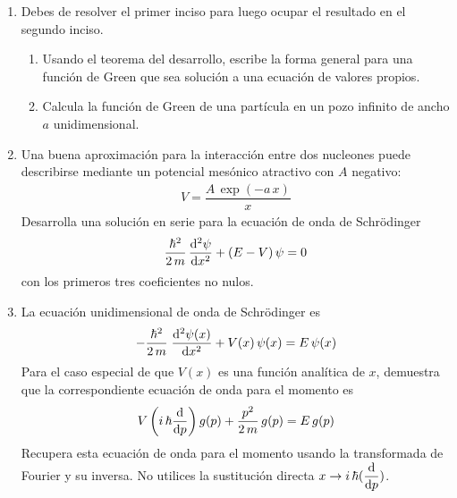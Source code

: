 \begin{enumerate}
\item Debes de resolver el primer inciso para luego ocupar el resultado en el segundo inciso.
\begin{enumerate}
\item Usando el teorema del desarrollo, escribe la forma general para una función de Green que sea solución a una ecuación de valores propios.
\item Calcula la función de Green de una partícula en un pozo infinito de ancho $a$ unidimensional.
\end{enumerate}
\item Una buena aproximación para la interacción entre dos nucleones puede describirse mediante un potencial mesónico atractivo con $A$ negativo:
\begin{align*}
V = \dfrac{A \, \exp(- a \, x)}{x}
\end{align*}
Desarrolla una solución en serie para la ecuación de onda de Schrödinger
\begin{align*}
\dfrac{\hbar^{2}}{2 \, m} \, \dv[2]{\psi}{x} + (E - V) \, \psi = 0
\end{align*}
con los primeros tres coeficientes no nulos.
\item La ecuación unidimensional de onda de Schrödinger es
\[ - \dfrac{\hbar^{2}}{2 \, m} \; \dv[2]{\psi(x)}{x} +  V(x) \, \psi(x) = E \, \psi (x) \]
Para el caso especial de que $V(x)$ es una función analítica de $x$, demuestra que la correspondiente ecuación de onda para el momento es
\[ V \left( i \, \hbar \dv{p} \right) g(p) + \dfrac{p^{2}}{2 \, m} \, g(p) =  E \, g(p)  \]
Recupera esta ecuación de onda para el momento usando la transformada de Fourier y su inversa. No utilices la sustitución directa $\displaystyle{x \to i \, \hbar (\dv{p})}$.
\end{enumerate}
